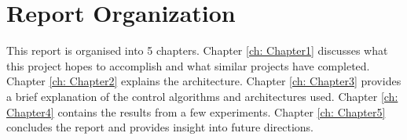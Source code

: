 \section{Report Organization}
This report is organised into 5 chapters.  Chapter \ref{ch: Chapter1} discusses
what this project hopes to accomplish and what similar projects have completed.
Chapter \ref{ch: Chapter2} explains the architecture. Chapter \ref{ch: Chapter3}
provides a brief explanation of the control algorithms and architectures used.
Chapter \ref{ch: Chapter4} contains the results from a few experiments. Chapter \ref{ch: Chapter5} concludes the report and provides insight into future directions.

